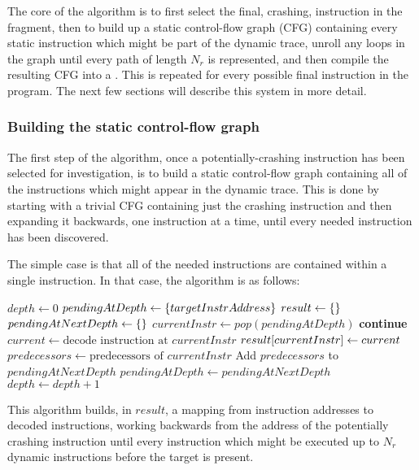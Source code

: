 The core of the algorithm is to first select the final, crashing, instruction in the fragment, then to build up a static control-flow graph (CFG) containing every static instruction which might be part of the dynamic trace, unroll any loops in the graph until every path of length $N_r$ is represented, and then compile the resulting CFG into a \StateMachine.
This is repeated for every possible final instruction in the program.
The next few sections will describe this system in more detail.

\subsubsection{Building the static control-flow graph}
The first step of the algorithm, once a potentially-crashing instruction has been selected for investigation, is to build a static control-flow graph containing all of the instructions which might appear in the dynamic trace.
This is done by starting with a trivial CFG containing just the crashing instruction and then expanding it backwards, one instruction at a time, until every needed instruction has been discovered.

The simple case is that all of the needed instructions are contained within a single instruction.
In that case, the algorithm is as follows:

\begin{algorithmic}[1]
\STATE $depth \gets 0$
\STATE $pendingAtDepth \gets \{targetInstrAddress\}$
\STATE $result \gets \{\}$
  \STATE $pendingAtNextDepth \gets \{\}$
    \STATE $currentInstr \gets pop(pendingAtDepth)$
      \STATE \textbf{continue}
    \ENDIF
    \STATE $current \gets \text{decode instruction at } currentInstr$
    \STATE $result[currentInstr] \gets current$
    \STATE $predecessors \gets \text{predecessors of } currentInstr$
    \STATE Add $predecessors$ to $pendingAtNextDepth$
  \ENDWHILE
  \STATE $pendingAtDepth \gets pendingAtNextDepth$
  \STATE $depth \gets depth + 1$
\ENDWHILE
\end{algorithmic}

This algorithm builds, in $result$, a mapping from instruction addresses to decoded instructions, working backwards from the address of the potentially crashing instruction until every instruction which might be executed up to $N_r$ dynamic instructions before the target is present.

